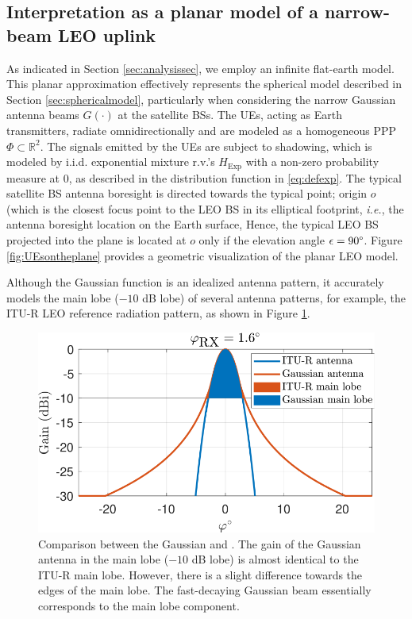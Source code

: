 \documentclass[lettersize,journal]{IEEEtran}
\begin{document}
\subsection{Interpretation as a planar model of a narrow-beam LEO uplink}
\label{sec:planarmodel}


As indicated in Section \ref{sec:analysissec}, we employ an infinite flat-earth model.  This planar approximation effectively represents the spherical model described in Section \ref{sec:sphericalmodel}, particularly when considering the narrow Gaussian antenna beams $G(\cdot)$ at the satellite BSs. The UEs, acting as Earth transmitters, radiate omnidirectionally and are modeled as a homogeneous PPP $\Phi \subset \mathbb{R}^2$. The signals emitted by the UEs are subject to shadowing, which is modeled by i.i.d. exponential mixture r.v.'s $H_{\text{Exp}}$ with a non-zero probability measure at $0$, as described in the distribution function in \eqref{eq:defexp}. The typical satellite BS antenna boresight is directed towards the typical point; origin $\textit{o}$ (which is the closest focus point to the LEO BS in its elliptical footprint, \textit{i.e.}, the antenna boresight location on the Earth surface,  Hence, the typical LEO BS projected into the plane is located at $\textit{o}$ only if the elevation angle $\epsilon=90 \degree$. Figure \ref{fig:UEsontheplane} provides a geometric visualization of the planar LEO model.



Although the Gaussian function is an idealized antenna pattern, it accurately models the main lobe ($-10$ dB lobe) of several antenna patterns, for example, the ITU-R LEO reference radiation pattern, as shown in Figure \ref{fig:antennapats}.

\begin{figure}[h]
  \centering
  \includegraphics[width=\linewidth]{antennapats.pdf}
  \caption{Comparison between the Gaussian and \cite[ITU-R LEO reference radiation patterns]{ITURS1528}. The gain of the Gaussian antenna in the main lobe ($-10$ dB lobe) is almost identical to the ITU-R main lobe. However, there is a slight difference towards the edges of the main lobe. 
    The fast-decaying Gaussian beam essentially corresponds to the main lobe component.} 
  \label{fig:antennapats}
\end{figure}
\end{document}
